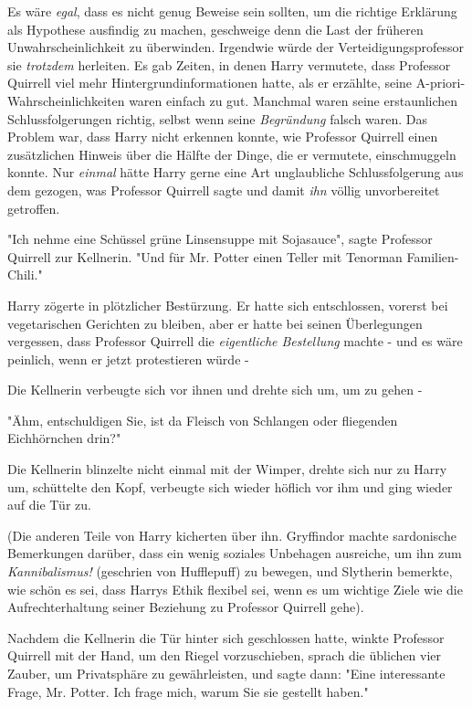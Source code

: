 {Es wäre \emph{egal}, dass es nicht genug Beweise sein sollten, um die richtige Erklärung als Hypothese ausfindig zu machen, geschweige denn die Last der früheren Unwahrscheinlichkeit zu überwinden. Irgendwie würde der Verteidigungsprofessor sie \emph{trotzdem} herleiten. Es gab Zeiten, in denen Harry vermutete, dass Professor Quirrell viel mehr Hintergrundinformationen hatte, als er erzählte, seine A-priori-Wahrscheinlichkeiten waren einfach zu gut. Manchmal waren seine erstaunlichen Schlussfolgerungen richtig, selbst wenn seine \emph{Begründung} falsch waren. Das Problem war, dass Harry nicht erkennen konnte, wie Professor Quirrell einen zusätzlichen Hinweis über die Hälfte der Dinge, die er vermutete, einschmuggeln konnte. Nur \emph{einmal} hätte Harry gerne eine Art unglaubliche Schlussfolgerung aus dem gezogen, was Professor Quirrell sagte und damit \emph{ihn} völlig unvorbereitet getroffen.

"Ich nehme eine Schüssel grüne Linsensuppe mit Sojasauce", sagte Professor Quirrell zur Kellnerin. "Und für Mr. Potter einen Teller mit Tenorman Familien-Chili."

Harry zögerte in plötzlicher Bestürzung. Er hatte sich entschlossen, vorerst bei vegetarischen Gerichten zu bleiben, aber er hatte bei seinen Überlegungen vergessen, dass Professor Quirrell die \emph{eigentliche Bestellung} machte - und es wäre peinlich, wenn er jetzt protestieren würde -

Die Kellnerin verbeugte sich vor ihnen und drehte sich um, um zu gehen -

"Ähm, entschuldigen Sie, ist da Fleisch von Schlangen oder fliegenden Eichhörnchen drin?"

Die Kellnerin blinzelte nicht einmal mit der Wimper, drehte sich nur zu Harry um, schüttelte den Kopf, verbeugte sich wieder höflich vor ihm und ging wieder auf die Tür zu.

(Die anderen Teile von Harry kicherten über ihn. Gryffindor machte sardonische Bemerkungen darüber, dass ein wenig soziales Unbehagen ausreiche, um ihn zum \emph{Kannibalismus!} (geschrien von Hufflepuff) zu bewegen, und Slytherin bemerkte, wie schön es sei, dass Harrys Ethik flexibel sei, wenn es um wichtige Ziele wie die Aufrechterhaltung seiner Beziehung zu Professor Quirrell gehe).

Nachdem die Kellnerin die Tür hinter sich geschlossen hatte, winkte Professor Quirrell mit der Hand, um den Riegel vorzuschieben, sprach die üblichen vier Zauber, um Privatsphäre zu gewährleisten, und sagte dann: "Eine interessante Frage, Mr. Potter. Ich frage mich, warum Sie sie gestellt haben."

}
